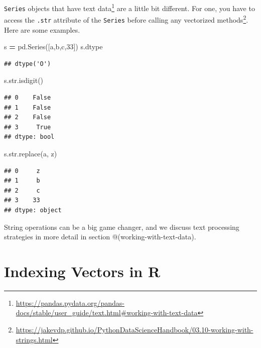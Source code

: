 \documentclass[
  12pt,
  krantz2]{krantz}
\makeatletter
\newenvironment{Shaded}{\begin{snugshade}}{\end{snugshade}}
\newcommand{\BuiltInTok}[1]{#1}
\newcommand{\NormalTok}[1]{#1}
\newcommand{\OperatorTok}[1]{\textcolor[rgb]{0.43,0.43,0.43}{\textbf{#1}}}
\newcommand{\StringTok}[1]{\textcolor[rgb]{0.5,0.5,0.5}{#1}}
\renewcommand{\href}[2]{#2\footnote{\url{#1}}}
\newenvironment{kframe}{%
\medskip{}
\setlength{\fboxsep}{.8em}
 \def\at@end@of@kframe{}%
 \ifinner\ifhmode%
  \def\at@end@of@kframe{\end{minipage}}%
  \begin{minipage}{\columnwidth}%
 \fi\fi%
 \def\FrameCommand##1{\hskip\@totalleftmargin \hskip-\fboxsep
 \colorbox{shadecolor}{##1}\hskip-\fboxsep
     \hskip-\linewidth \hskip-\@totalleftmargin \hskip\columnwidth}%
 \MakeFramed {\advance\hsize-\width
   \@totalleftmargin\z@ \linewidth\hsize
   \@setminipage}}%
 {\par\unskip\endMakeFramed%
 \at@end@of@kframe}
\renewenvironment{Shaded}{\begin{kframe}}{\end{kframe}}
\makeatother
\begin{document}
\texttt{Series} objects that have \href{https://pandas.pydata.org/pandas-docs/stable/user_guide/text.html\#working-with-text-data}{text data} are a little bit different. For one, you have to access the \texttt{.str} attribute of the \texttt{Series} before calling any \href{https://jakevdp.github.io/PythonDataScienceHandbook/03.10-working-with-strings.html}{vectorized methods}. Here are some examples.

\begin{Shaded}
\begin{Highlighting}[]
\NormalTok{s }\OperatorTok{=}\NormalTok{ pd.Series([}\StringTok{\textquotesingle{}a\textquotesingle{}}\NormalTok{,}\StringTok{\textquotesingle{}b\textquotesingle{}}\NormalTok{,}\StringTok{\textquotesingle{}c\textquotesingle{}}\NormalTok{,}\StringTok{\textquotesingle{}33\textquotesingle{}}\NormalTok{])}
\NormalTok{s.dtype}
\end{Highlighting}
\end{Shaded}

\begin{verbatim}
## dtype('O')
\end{verbatim}

\begin{Shaded}
\begin{Highlighting}[]
\NormalTok{s.}\BuiltInTok{str}\NormalTok{.isdigit()}
\end{Highlighting}
\end{Shaded}

\begin{verbatim}
## 0    False
## 1    False
## 2    False
## 3     True
## dtype: bool
\end{verbatim}

\begin{Shaded}
\begin{Highlighting}[]
\NormalTok{s.}\BuiltInTok{str}\NormalTok{.replace(}\StringTok{\textquotesingle{}a\textquotesingle{}}\NormalTok{, }\StringTok{\textquotesingle{}z\textquotesingle{}}\NormalTok{)}
\end{Highlighting}
\end{Shaded}

\begin{verbatim}
## 0     z
## 1     b
## 2     c
## 3    33
## dtype: object
\end{verbatim}

String operations can be a big game changer, and we discuss text processing strategies in more detail in section @(working-with-text-data).

\hypertarget{indexing-vectors-in-r}{%
\section{Indexing Vectors in R}\label{indexing-vectors-in-r}}
\end{document}
